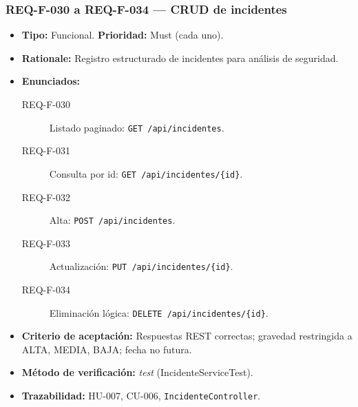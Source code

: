 \documentclass[12pt,a4paper]{article}
\begin{document}
\subsubsection{REQ-F-030 a REQ-F-034 — CRUD de incidentes}
\begin{itemize}
  \item \textbf{Tipo:} Funcional. \textbf{Prioridad:} Must (cada uno).
  \item \textbf{Rationale:} Registro estructurado de incidentes para análisis de seguridad.
  \item \textbf{Enunciados:}
    \begin{description}
      \item[REQ-F-030] Listado paginado: \texttt{GET /api/incidentes}.
      \item[REQ-F-031] Consulta por id: \texttt{GET /api/incidentes/\{id\}}.
      \item[REQ-F-032] Alta: \texttt{POST /api/incidentes}.
      \item[REQ-F-033] Actualización: \texttt{PUT /api/incidentes/\{id\}}.
      \item[REQ-F-034] Eliminación lógica: \texttt{DELETE /api/incidentes/\{id\}}.
    \end{description}
  \item \textbf{Criterio de aceptación:} Respuestas REST correctas; gravedad restringida a
  ALTA, MEDIA, BAJA; fecha no futura.
  \item \textbf{Método de verificación:} \textit{test} (IncidenteServiceTest).
  \item \textbf{Trazabilidad:} HU-007, CU-006, \texttt{IncidenteController}.
\end{itemize}

\end{document}
